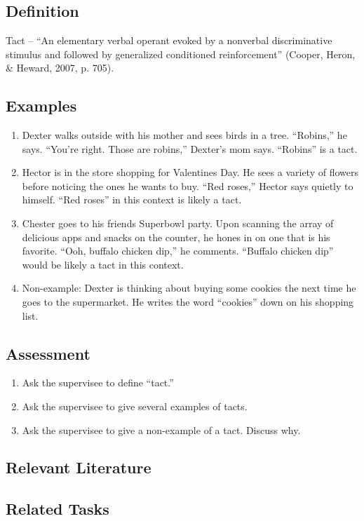\clearpage \section{\fourFKFourtyFive{}}
\subsection{Definition}
Tact – ``An elementary verbal operant evoked by a nonverbal discriminative stimulus and followed by generalized conditioned reinforcement'' (Cooper, Heron, \& Heward, 2007, p. 705).
%
\subsection{Examples}
\begin{enumerate}
\item Dexter walks outside with his mother and sees birds in a tree.  ``Robins,'' he says.  ``You're right. Those are robins,'' Dexter's mom says. ``Robins'' is a tact.
\item Hector is in the store shopping for Valentines Day.  He sees a variety of flowers before noticing the ones he wants to buy.  ``Red roses,'' Hector says quietly to himself. ``Red roses'' in this context is likely a tact. 
\item Chester goes to his friends Superbowl party.  Upon scanning the array of delicious apps and snacks on the counter, he hones in on one that is his favorite.  ``Ooh, buffalo chicken dip,'' he comments.  ``Buffalo chicken dip'' would be likely a tact in this context.
\item Non-example: Dexter is thinking about buying some cookies the next time he goes to the supermarket.  He writes the word ``cookies'' down on his shopping list. 
%
\end{enumerate}
%
\subsection{Assessment}
\begin{enumerate}
\item Ask the supervisee to define ``tact.''  
\item Ask the supervisee to give several examples of tacts.
\item Ask the supervisee to give a non-example of a tact. Discuss why.
%
\end{enumerate}
%
\subsection{Relevant Literature}
\begin{refsection}
\nocite{cooper2007applied,
        skinner1957verbal}
\printbibliography[heading=none]
\end{refsection}
%
\subsection{Related Tasks}
\fourdTwelve{}\\
